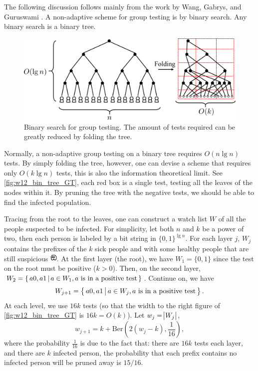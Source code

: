 The following discussion follows mainly from the work by Wang, Gabrys, and Guruswami \cite{Quickly_Decodable_GT}. A non-adaptive scheme for group testing is by binary search. Any binary search is a binary tree.

\begin{figure}[H]
    \centering
    \includegraphics[width=0.8\linewidth]{figures/w12_bin_tree_GT.png}
    \caption{Binary search for group testing. The amount of tests required can be greatly reduced by folding the tree.}
    \label{fig:w12_bin_tree_GT}
\end{figure}

Normally, a non-adaptive group testing on a binary tree requires $O(n\lg n)$ tests. By simply folding the tree, however, one can devise a scheme that requires only $O(k\lg n)$ tests, this is also the information theoretical limit. See \autoref{fig:w12_bin_tree_GT}, each red box is a single test, testing all the leaves of the nodes within it. By pruning the tree with the negative tests, we should be able to find the infected population.

Tracing from the root to the leaves, one can construct a watch list $W$ of all the people suspected to be infected. For simplicity, let both $n$ and $k$ be a power of two, then each person is labeled by a bit string in $\{0,1\}^{\lg n}$. For each layer $j$, $W_j$ contains the prefixes of the $k$ sick people and with some healthy people that are still suspicious \includegraphics[height=1em]{figures/w12_sus.png}. At the first layer (the root), we have $W_1 = \{0,1\}$ since the test on the root must be positive ($k>0$). Then, on the second layer, $W_2 = \left\{\,{a0,a1}\,\middle\vert\,{a\in W_1, a \text{ is in a positive test}}\,\right\}$. Continue on, we have
\begin{equation}
    W_{j+1} = \left\{\,{a0,a1}\,\middle\vert\,{a\in W_j, a \text{ is in a positive test}}\,\right\}.
\end{equation}
At each level, we use $16k$ tests (so that the width to the right figure of \autoref{fig:w12_bin_tree_GT} is $16k=O(k)$). Let $w_j = \abs{W_j}$, 
\begin{equation}
    w_{j+1} = k + \mathrm{Ber}\left(2(w_j-k),\frac{1}{16}\right),
\end{equation}
where the probability $\frac{1}{16}$ is due to the fact that: there are $16k$ tests each layer, and there are $k$ infected person, the probability that each prefix contains no infected person will be pruned away is $15/16$.

